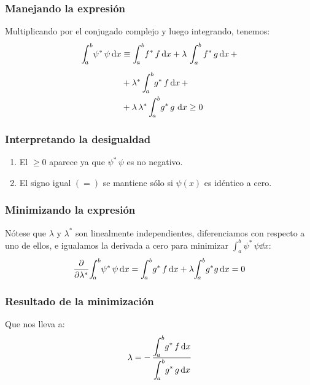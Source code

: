 \documentclass[12pt]{beamer}
\begin{document}
\begin{frame}
\frametitle{Manejando la expresión}
Multiplicando por el conjugado complejo y luego integrando, tenemos:
\pause
\begin{align}
\begin{aligned}
\scaleint{5ex}_{\bs a}^{b} \psi^{*} \, \psi \dd{x} &\equiv \scaleint{5ex}_{\bs a}^{b} f^{*} \, f \dd{x} + \lambda \, \int_{a}^{b} f^{*} \, g \dd{x} + \\[0.5em]
&+ \lambda^{*} \, \scaleint{5ex}_{\bs a}^{b} g^{*} \, f \dd{x} + \\
&+ \lambda \, \lambda^{*} \, \scaleint{5ex}_{\bs a}^{b} g^{*} \, g \, \dd{x}  \geq 0
\end{aligned}
\label{eq:ecuacion_10_79}
\end{align}
\end{frame}
\begin{frame}
\frametitle{Interpretando la desigualdad}
\begin{enumerate}[<+->]
\item El $\geq 0$ aparece ya que $\psi^{*} \, \psi$ es no negativo.
\item El signo igual $(=)$ se mantiene sólo si $\psi (x)$ es idéntico a cero.
\end{enumerate}
\end{frame}
\begin{frame}
\frametitle{Minimizando la expresión}
Nótese que $\lambda$ y $\lambda^{*}$ son linealmente independientes, \pause diferenciamos con respecto a uno de ellos, \pause e igualamos la derivada a cero para minimizar $\displaystyle \int_{a}^{b} \psi^{*} \, \psi \dd{x}$:
\pause
\begin{align*}
\pdv{\lambda^{*}} \scaleint{5ex}_{\bs a}^{b} \psi^{*} \, \psi \dd{x} = \scaleint{5ex}_{\bs a}^{b} g^{*} \, f \dd{x}  + \lambda \scaleint{5ex}_{\bs a}^{b} g^{*} g \dd{x} = 0
\end{align*}
\end{frame}
\begin{frame}
\frametitle{Resultado de la minimización}
Que nos lleva a:
\pause
\begin{align}
\lambda = - \, \dfrac{\displaystyle \scaleint{5ex}_{\bs a}^{b} g^{*} \, f \dd{x}}{\displaystyle \scaleint{5ex}_{\bs a}^{b} g^{*} \, g \dd{x}}
\label{eq:ecuacion_10_80a}
\end{align}
\end{frame}
\end{document}
